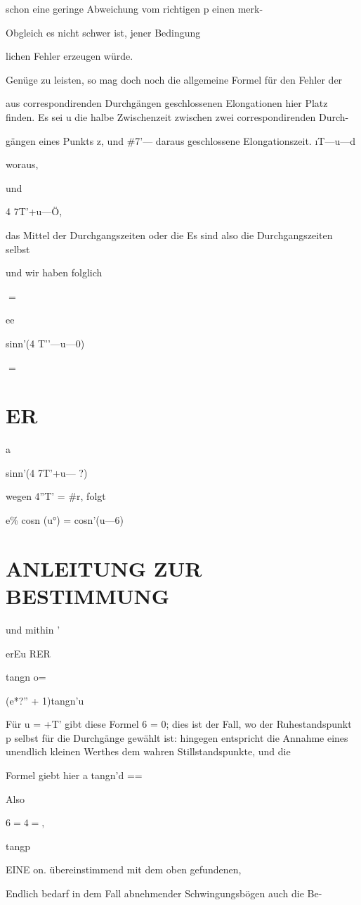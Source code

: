 \documentclass[12pt,a4paper]{article}
\begin{document}
schon eine geringe Abweichung vom richtigen p einen merk-

Obgleich es nicht schwer ist, jener Bedingung

lichen Fehler erzeugen würde.

Genüge zu leisten, so mag doch noch die allgemeine Formel für den Fehler der

aus correspondirenden Durchgängen geschlossenen Elongationen hier Platz finden. Es sei u die halbe Zwischenzeit zwischen zwei correspondirenden Durch-

gängen eines Punkts z, und \#7’— daraus geschlossene Elongationszeit. ıT—u—d

woraus,

und

4 7T’+u—Ö,

das Mittel der Durchgangszeiten oder die Es sind also die Durchgangszeiten selbst

und wir haben folglich

$=$

ee

sinn’(4 T’’—u—0)

$=$

\section*{ER}
a

sinn’(4 7T’+u— ?)

wegen 4”T' = \#r, folgt

e\% cosn (u°) = cosn’(u—6)

\section*{ANLEITUNG ZUR BESTIMMUNG}
und mithin '

erEu RER

tangn o=

(e*?” + 1)tangn’u

Für u = +T’ gibt diese Formel 6 = 0; dies ist der Fall, wo der Ruhestandspunkt p selbst für die Durchgänge gewählt ist: hingegen entspricht die Annahme eines unendlich kleinen Werthes dem wahren Stillstandspunkte, und die

Formel giebt hier a tangn’d ==

Also

$6= 4 =,$

tangp

EINE on. übereinstimmend mit dem oben gefundenen,

Endlich bedarf in dem Fall abnehmender Schwingungsbögen auch die Be-
\end{document}
